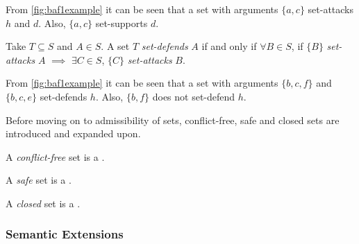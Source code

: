             \begin{exa}
                From \autoref{fig:baf1example} it can be seen that a set with arguments $\{a, c\}$ set-attacks $h$ and $d$. Also, $\{a, c\}$ set-supports $d$.
                \label{exa:example12}
            \end{exa}
            
            \begin{definition}
                Take $T \subseteq S$ and $A \in S$. A set $T$ \textit{set-defends} $A$ if and only if $\forall B \in S$, if $\{B\}$ \textit{set-attacks} $A$ $\implies$ $\exists C \in S$, $\{C\}$ \textit{set-attacks} $B$.
                \label{definition:definition15}
            \end{definition}
            
            \begin{exa}
                From \autoref{fig:baf1example} it can be seen that a set with arguments $\{b, c, f\}$ and $\{b, c, e\}$ set-defends $h$. Also, $\{b, f\}$ does not set-defend $h$.
                \label{exa:example13}
            \end{exa}
            
            Before moving on to admissibility of sets, conflict-free, safe and closed sets are introduced and expanded upon.
            
            \begin{definition}
                A \textit{conflict-free} set is a .
                \label{definition:definition16}
            \end{definition}
            
            \begin{definition}
                A \textit{safe} set is a .
                \label{definition:definition17}
            \end{definition}
            
            \begin{definition}
                A \textit{closed} set is a .
                \label{definition:definition18}
            \end{definition}
            
        \subsubsection{Semantic Extensions}
            